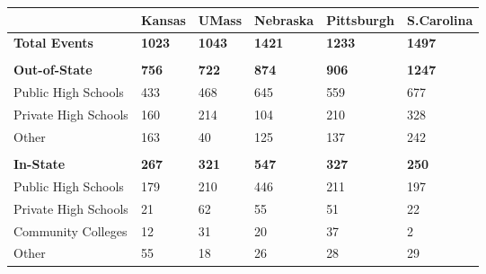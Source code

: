 \begin{longtabu}{X[1.6,l] X[1,c] X[1,c] X[1,c] X[1,c] X[1,c]}%
\textbf{}&\textbf{Kansas}&\textbf{UMass}&\textbf{Nebraska}&\textbf{Pittsburgh}&\textbf{S.Carolina}\\%
\hline%
\textbf{Total Events}&\textbf{1023}&\textbf{1043}&\textbf{1421}&\textbf{1233}&\textbf{1497}\\%
&&&&&\\%
\textbf{Out{-}of{-}State}&\textbf{756}&\textbf{722}&\textbf{874}&\textbf{906}&\textbf{1247}\\%
\hspace{0.4cm}Public High Schools&433&468&645&559&677\\%
\hspace{0.4cm}Private High Schools&160&214&104&210&328\\%
\hspace{0.4cm}Other&163&40&125&137&242\\%
&&&&&\\%
\textbf{In{-}State}&\textbf{267}&\textbf{321}&\textbf{547}&\textbf{327}&\textbf{250}\\%
\hspace{0.4cm}Public High Schools&179&210&446&211&197\\%
\hspace{0.4cm}Private High Schools&21&62&55&51&22\\%
\hspace{0.4cm}Community Colleges&12&31&20&37&2\\%
\hspace{0.4cm}Other&55&18&26&28&29\\%
\hline%
\end{longtabu}
